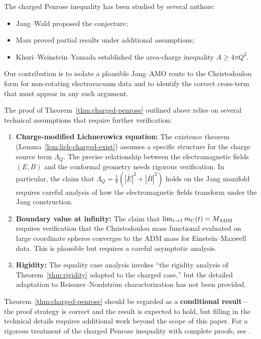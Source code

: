 \begin{remark}
The charged Penrose inequality has been studied by several authors:
\begin{itemize}
    \item Jang--Wald \cite{jangwald1977} proposed the conjecture;
    \item Mars \cite{mars2009} proved partial results under additional assumptions;
    \item Khuri--Weinstein--Yamada \cite{khuri2017} established the area-charge inequality $A \geq 4\pi Q^2$.
\end{itemize}
Our contribution is to isolate a plausible Jang--AMO route to the Christodoulou form for non-rotating electrovacuum data and to identify the correct cross-term that must appear in any such argument.
\end{remark}

\begin{remark}
The proof of Theorem~\ref{thm:charged-penrose} outlined above relies on several technical assumptions that require further verification:

\begin{enumerate}
    \item \textbf{Charge-modified Lichnerowicz equation:} The existence theorem (Lemma~\ref{lem:lich-charged-exist}) assumes a specific structure for the charge source term $\Lambda_Q$. The precise relationship between the electromagnetic fields $(E, B)$ and the conformal geometry needs rigorous verification. In particular, the claim that $\Lambda_Q = \frac{1}{8}(|\bar{E}|^2 + |\bar{B}|^2)$ holds on the Jang manifold requires careful analysis of how the electromagnetic fields transform under the Jang construction.
    
    \item \textbf{Boundary value at infinity:} The claim that $\lim_{t \to 1} m_C(t) = M_{\mathrm{ADM}}$ requires verification that the Christodoulou mass functional evaluated on large coordinate spheres converges to the ADM mass for Einstein--Maxwell data. This is plausible but requires a careful asymptotic analysis.
    
    \item \textbf{Rigidity:} The equality case analysis invokes ``the rigidity analysis of Theorem~\ref{thm:rigidity} adapted to the charged case,'' but the detailed adaptation to Reissner--Nordstr\"om characterization has not been provided.
\end{enumerate}

Theorem~\ref{thm:charged-penrose} should be regarded as a \textbf{conditional result}---the proof strategy is correct and the result is expected to hold, but filling in the technical details requires additional work beyond the scope of this paper. For a rigorous treatment of the charged Penrose inequality with complete proofs, see \cite{khuri2015charged, mars2009}.
\end{remark}

